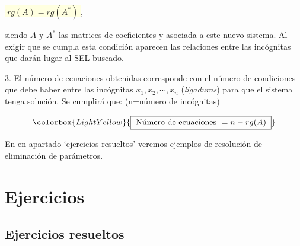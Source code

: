 \vspace{2mm}
\centerline{\colorbox{LightYellow}{$\; rg(A)=rg(A^*) \;$},} 

\noindent siendo $A$ y $A^*$ las  matrices de coeficientes y asociada a este nuevo sistema. Al exigir que se cumpla esta condición aparecen las relaciones entre las incógnitas que darán lugar al SEL buscado.

3. El número de ecuaciones obtenidas corresponde con el número de condiciones que debe haber entre las incógnitas $x_1,x_2,\cdots ,x_n$ (\textcolor{gris}{\emph{ligaduras}}) para que el sistema tenga solución. Se cumplirá que: (n=número de incógnitas)

\begin{equation*}
\colorbox{LightYellow}{\boxed{\text{ Número de ecuaciones } = n-rg(A)\; }}	
\end{equation*}

En en apartado `ejercicios resueltos' veremos ejemplos de resolución de eliminación de parámetros.


\section{Ejercicios}

\subsection{Ejercicios resueltos}

